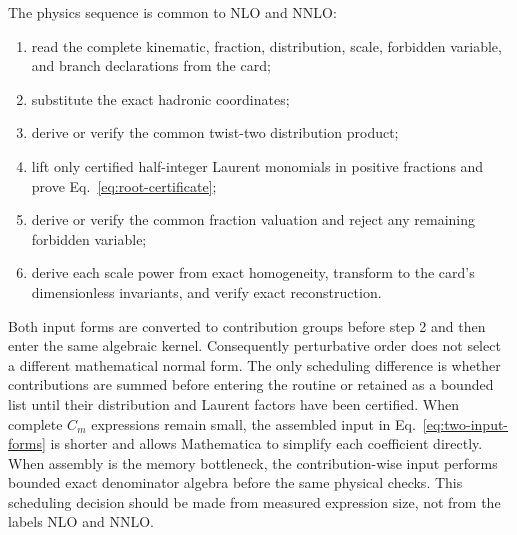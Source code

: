 \documentclass[11pt]{article}
\begin{document}
The physics sequence is common to NLO and NNLO:
\begin{enumerate}
  \item read the complete kinematic, fraction, distribution, scale, forbidden
        variable, and branch declarations from the card;
  \item substitute the exact hadronic coordinates;
  \item derive or verify the common twist-two distribution product;
  \item lift only certified half-integer Laurent monomials in positive
        fractions and prove Eq.~\eqref{eq:root-certificate};
  \item derive or verify the common fraction valuation and reject any remaining
        forbidden variable;
  \item derive each scale power from exact homogeneity, transform to the card's
        dimensionless invariants, and verify exact reconstruction.
\end{enumerate}
Both input forms are converted to contribution groups before step 2 and then
enter the same algebraic kernel.  Consequently perturbative order does not
select a different mathematical normal form.  The only scheduling difference
is whether contributions are summed before entering the routine or retained as
a bounded list until their distribution and Laurent factors have been
certified.
When complete $C_m$ expressions remain small, the assembled input in
Eq.~\eqref{eq:two-input-forms} is shorter and allows Mathematica to simplify
each coefficient directly.  When assembly is the memory bottleneck, the
contribution-wise input performs bounded exact denominator algebra before the
same physical checks.  This scheduling decision should be made from measured
expression size, not from the labels NLO and NNLO.
\end{document}
